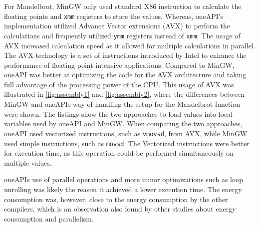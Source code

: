 For Mandelbrot, MinGW only used standard X86 instruction\cite{X86} to calculate the floating points and \texttt{xmm} registers to store the values. Whereas, oneAPI's implementation utilized Advance Vector extensions (AVX)\cite{AVXIntel} to perform the calculations and frequently utilized \texttt{ymm} registers instead of \texttt{xmm}. The usage of AVX increased calculation speed as it allowed for multiple calculations in parallel. The AVX technology is a set of instructions introduced by Intel to enhance the performance of floating-point-intensive applications\cite{AVXIntel}. Compared to MinGW, oneAPI was better at optimizing the code for the AVX architecture and taking full advantage of the processing power of the CPU. This usage of AVX was illustrated in \cref{fig:assembly1} and \cref{fig:assembly2}, where the differences between MinGW and oneAPIs way of handling the setup for the Mandelbrot function were shown. The listings show the two approaches to load values into local variables used by oneAPI and MinGW. When comparing the two approaches, oneAPI used vectorized instructions, such as \texttt{vmovsd}, from AVX, while MinGW used simple instructions, such as \texttt{movsd}. The Vectorized instructions were better for execution time, as this operation could be performed simultaneously on multiple values.

oneAPIs use of parallel operations and more minor optimizations such as loop unrolling was likely the reason it achieved a lower execution time. The energy consumption was, however, close to the energy consumption by the other compilers, which is an observation also found by other studies about energy consumption and parallelism\cite{Lindholt2022}. %









